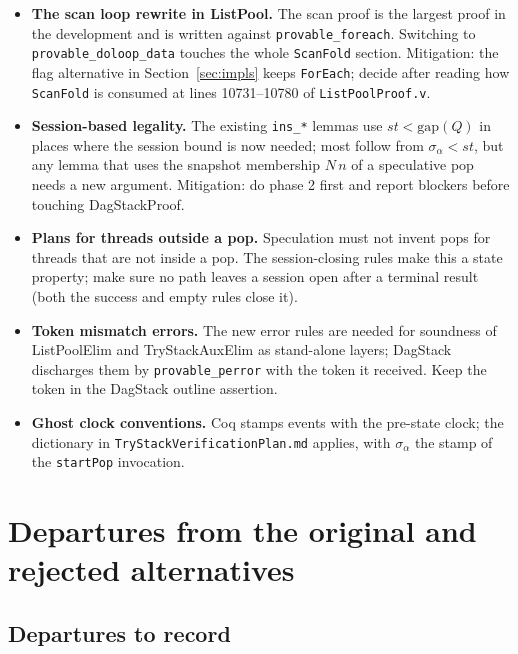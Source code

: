 \documentclass[11pt]{article}
\theoremstyle{definition}
\theoremstyle{remark}
\newcommand{\code}[1]{\texttt{#1}}
\newcommand{\file}[1]{\texttt{#1}}
\newcommand{\sess}{\sigma}
\newcommand{\sol}[1]{\textbf{#1}}
\newcommand{\gap}{\mathrm{gap}}
\begin{document}
\begin{itemize}
\item \sol{The scan loop rewrite in ListPool.} The scan proof is the
  largest proof in the development and is written against
  \code{provable\_foreach}. Switching to \code{provable\_doloop\_data}
  touches the whole \code{ScanFold} section. Mitigation: the flag
  alternative in Section~\ref{sec:impls} keeps \code{ForEach}; decide
  after reading how \code{ScanFold} is consumed at lines
  10731--10780 of \file{ListPoolProof.v}.
\item \sol{Session-based legality.} The existing \code{ins\_*} lemmas use
  $st < \gap(Q)$ in places where the session bound is now needed; most
  follow from $\sess_\alpha < st$, but any lemma that uses the snapshot
  membership $N\,n$ of a speculative pop needs a new argument. Mitigation:
  do phase 2 first and report blockers before touching DagStackProof.
\item \sol{Plans for threads outside a pop.} Speculation must not invent
  pops for threads that are not inside a pop. The session-closing rules
  make this a state property; make sure no path leaves a session open
  after a terminal result (both the success and empty rules close it).
\item \sol{Token mismatch errors.} The new error rules are needed for
  soundness of ListPoolElim and TryStackAuxElim as stand-alone layers;
  DagStack discharges them by \code{provable\_perror} with the token it
  received. Keep the token in the DagStack outline assertion.
\item \sol{Ghost clock conventions.} Coq stamps events with the pre-state
  clock; the dictionary in \file{TryStackVerificationPlan.md} applies,
  with $\sess_\alpha$ the stamp of the \code{startPop} invocation.
\end{itemize}

\section{Departures from the original and rejected alternatives}

\subsection{Departures to record}
\end{document}
